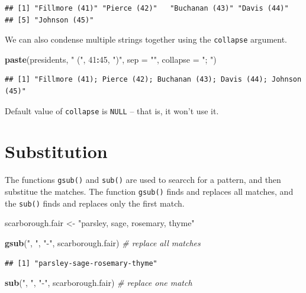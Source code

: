 \documentclass[
]{book}
\newenvironment{Shaded}{\begin{snugshade}}{\end{snugshade}}
\newcommand{\CommentTok}[1]{\textcolor[rgb]{0.56,0.35,0.01}{\textit{#1}}}
\newcommand{\DataTypeTok}[1]{\textcolor[rgb]{0.13,0.29,0.53}{#1}}
\newcommand{\DecValTok}[1]{\textcolor[rgb]{0.00,0.00,0.81}{#1}}
\newcommand{\KeywordTok}[1]{\textcolor[rgb]{0.13,0.29,0.53}{\textbf{#1}}}
\newcommand{\NormalTok}[1]{#1}
\newcommand{\OperatorTok}[1]{\textcolor[rgb]{0.81,0.36,0.00}{\textbf{#1}}}
\newcommand{\StringTok}[1]{\textcolor[rgb]{0.31,0.60,0.02}{#1}}
\begin{document}
\begin{verbatim}
## [1] "Fillmore (41)" "Pierce (42)"   "Buchanan (43)" "Davis (44)"   
## [5] "Johnson (45)"
\end{verbatim}

We can also condense multiple strings together using the \texttt{collapse} argument.

\begin{Shaded}
\begin{Highlighting}[]
\KeywordTok{paste}\NormalTok{(presidents, }\StringTok{" ("}\NormalTok{, }\DecValTok{41}\OperatorTok{:}\DecValTok{45}\NormalTok{, }\StringTok{")"}\NormalTok{, }\DataTypeTok{sep =} \StringTok{""}\NormalTok{, }\DataTypeTok{collapse =} \StringTok{"; "}\NormalTok{)}
\end{Highlighting}
\end{Shaded}

\begin{verbatim}
## [1] "Fillmore (41); Pierce (42); Buchanan (43); Davis (44); Johnson (45)"
\end{verbatim}

Default value of \texttt{collapse} is \texttt{NULL} -- that is, it won't use it.

\hypertarget{substitution}{%
\section{Substitution}\label{substitution}}

The functions \texttt{gsub()} and \texttt{sub()} are used to searcch for a pattern, and then substitue the matches. The function \texttt{gsub()} finds and replaces all matches, and the \texttt{sub()} finds and replaces only the first match.

\begin{Shaded}
\begin{Highlighting}[]
\NormalTok{scarborough.fair <-}\StringTok{ "parsley, sage, rosemary, thyme"}

\KeywordTok{gsub}\NormalTok{(}\StringTok{", "}\NormalTok{, }\StringTok{"-"}\NormalTok{, scarborough.fair)  }\CommentTok{# replace all matches }
\end{Highlighting}
\end{Shaded}

\begin{verbatim}
## [1] "parsley-sage-rosemary-thyme"
\end{verbatim}

\begin{Shaded}
\begin{Highlighting}[]
\KeywordTok{sub}\NormalTok{(}\StringTok{", "}\NormalTok{, }\StringTok{"-"}\NormalTok{, scarborough.fair)  }\CommentTok{# replace one match }
\end{Highlighting}
\end{Shaded}
\end{document}
